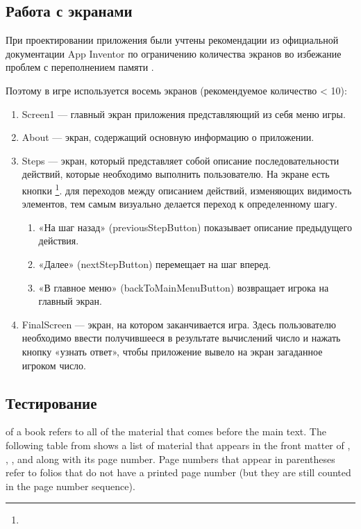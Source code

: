 \subsection{Работа с экранами}
При проектировании приложения были учтены рекомендации из официальной документации App Inventor по ограничению количества экранов во избежание проблем с переполнением памяти \cite{MitManyScreens}.

Поэтому в игре используется восемь экранов (рекомендуемое количество < 10):
\begin{enumerate}
\item Screen1 — главный экран приложения представляющий из себя меню игры.
\item About — экран, содержащий основную информацию о приложении.
\item Steps — экран, который представляет собой описание последовательности действий, которые необходимо выполнить пользователю. На экране есть кнопки \footnote[][-0cm]{
}. 
  для переходов между описанием действий, изменяющих видимость элементов, тем самым визуально делается переход к определенному шагу.
\begin{enumerate}
  \item «На шаг назад» (previousStepButton) показывает описание предыдущего действия.
  \item «Далее» (nextStepButton) перемещает на шаг вперед.
  \item «В главное меню» (backToMainMenuButton) возвращает игрока на главный экран.
\end{enumerate}
\item FinalScreen — экран, на котором заканчивается игра. Здесь пользователю необходимо ввести получившееся в результате вычислений число и нажать кнопку «узнать ответ», чтобы приложение вывело на экран загаданное игроком число.

\end{enumerate}

\subsection{Тестирование}

 of a book refers to all of the material that
comes before the main text.  The following table from shows a list of
material that appears in the front matter of \VDQI, \EI, \VE, and \BE
along with its page number.  Page numbers that appear in parentheses refer
to folios that do not have a printed page number (but they are still
counted in the page number sequence).
